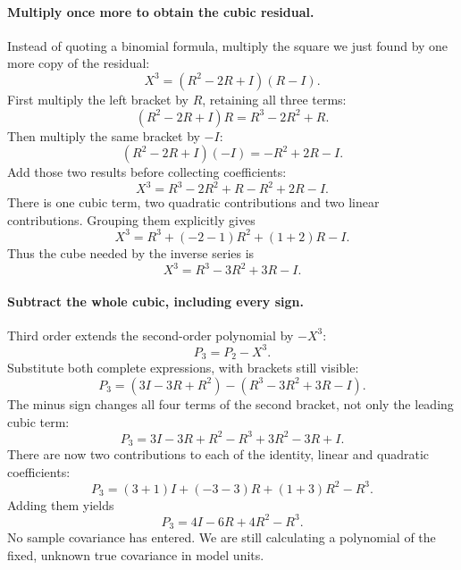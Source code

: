 \documentclass[11pt]{article}
\begin{document}
\paragraph{Multiply once more to obtain the cubic residual.}
Instead of quoting a binomial formula, multiply the square we just found
by one more copy of the residual:
\begin{equation}
 X^3=(R^2-2R+I)(R-I).
\end{equation}
First multiply the left bracket by $R$, retaining all three terms:
\begin{equation}
 (R^2-2R+I)R=R^3-2R^2+R.
\end{equation}
Then multiply the same bracket by $-I$:
\begin{equation}
 (R^2-2R+I)(-I)=-R^2+2R-I.
\end{equation}
Add those two results before collecting coefficients:
\begin{equation}
 X^3=R^3-2R^2+R-R^2+2R-I.
\end{equation}
There is one cubic term, two quadratic contributions and two linear
contributions. Grouping them explicitly gives
\begin{equation}
 X^3=R^3+(-2-1)R^2+(1+2)R-I.
\end{equation}
Thus the cube needed by the inverse series is
\begin{equation}
 X^3=R^3-3R^2+3R-I.
\end{equation}

\paragraph{Subtract the whole cubic, including every sign.}
Third order extends the second-order polynomial by $-X^3$:
\begin{equation}
 P_3=P_2-X^3.
\end{equation}
Substitute both complete expressions, with brackets still visible:
\begin{equation}
 P_3=(3I-3R+R^2)-(R^3-3R^2+3R-I).
\end{equation}
The minus sign changes all four terms of the second bracket, not only
the leading cubic term:
\begin{equation}
 P_3=3I-3R+R^2-R^3+3R^2-3R+I.
\end{equation}
There are now two contributions to each of the identity, linear and
quadratic coefficients:
\begin{equation}
 P_3=(3+1)I+(-3-3)R+(1+3)R^2-R^3.
\end{equation}
Adding them yields
\begin{equation}
 P_3=4I-6R+4R^2-R^3.
\end{equation}
No sample covariance has entered. We are still calculating a polynomial
of the fixed, unknown true covariance in model units.
\end{document}
